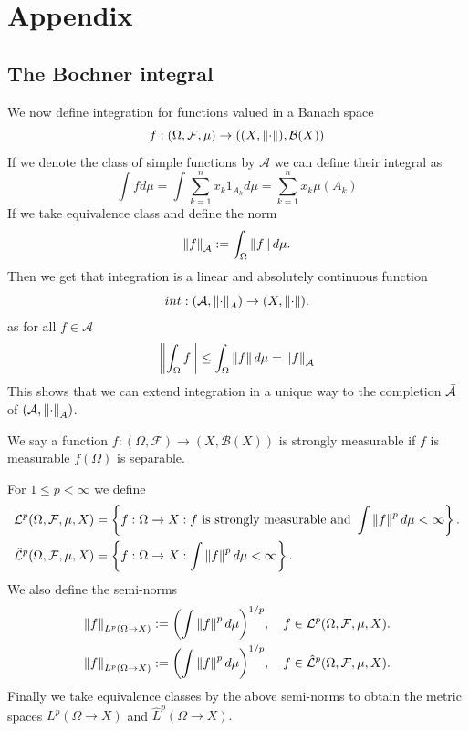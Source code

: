 \documentclass[
    a4paper,
    DIV=14,
    abstract=true,
    numbers=noenddot
]{scrartcl}
\begin{document}
\section{Appendix}
\subsection{The Bochner integral}
We now define integration for functions valued in a Banach space \begin{equation*}
	f:(\Omega,\mathcal{F},\mu)\to ((X,\left\lVert \cdot \right\rVert),\mathcal{B}(X))
\end{equation*}
If we denote the class of simple functions by $\mathcal{A}$ we can define their integral as
\begin{equation*}
	\int f d\mu=\int \sum_{k=1}^n x_k 1_{A_k} d\mu=\sum_{k=1}^n x_k\mu({A_k})
\end{equation*}
If we take equivalence class and define the norm
\begin{equation*}
	\left\lVert f \right\rVert_\mathcal{A}:=\int_\Omega \left\lVert f \right\rVert d\mu.
\end{equation*}
Then we get that integration is a linear and absolutely continuous function
\begin{equation*}
	int: \qty(\mathcal{A},\left\lVert \cdot \right\rVert_A)\to (X,\left\lVert \cdot \right\rVert).
\end{equation*}
as for all $f\in\mathcal{A}$
\begin{equation*}
	\left\lVert \int_\Omega f \right\rVert\leq\int_\Omega \left\lVert f \right\rVert d\mu=\left\lVert f \right\rVert_\mathcal{A}
\end{equation*}
This shows that we can extend integration in a unique way to the completion $\Bar{\mathcal{A}}$ of $\qty(\mathcal{A},\left\lVert \cdot \right\rVert_A)$.
\begin{definition}
	We say a function $f:(\Omega,\mathcal{F})\to (X,\mathcal{B}(X))$ is strongly measurable if $f$ is measurable $f(\Omega)$ is separable.
\end{definition}
\begin{definition}
	For $1\leq p<\infty$ we define
	\begin{align*}
		\mathcal{L}^p(\Omega,\mathcal{F},\mu,X)       & =\left\{f:\Omega\to X: f \text{ is strongly measurable and } \int \left\lVert f \right\rVert^p d\mu<\infty\right\}. \\
		\hat{\mathcal{L}}^p(\Omega,\mathcal{F},\mu,X) & =\left\{f:\Omega\to X: \int \left\lVert f \right\rVert^p d\mu<\infty\right\}.
	\end{align*}
	We also define the semi-norms
	\begin{align*}
		\left\lVert f \right\rVert_{L^p(\Omega\to X)}       & :=\qty(\int \left\lVert f \right\rVert^p d\mu)^{1/p},\quad f\in\mathcal{L}^p(\Omega,\mathcal{F},\mu,X).       \\
		\left\lVert f \right\rVert_{\hat{L}^p(\Omega\to X)} & :=\qty(\int \left\lVert f \right\rVert^p d\mu)^{1/p},\quad f\in\hat{\mathcal{L}}^p(\Omega,\mathcal{F},\mu,X).
	\end{align*}
	Finally we take equivalence classes by the above semi-norms to obtain the metric spaces $L^p(\Omega\to X)$ and $\hat{L}^p(\Omega\to X).$
\end{definition}
\end{document}
